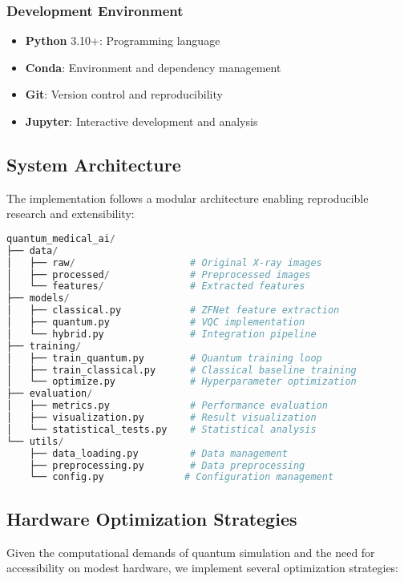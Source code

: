 \documentclass[conference]{IEEEtran}
\begin{document}
\subsubsection{Development Environment}
\begin{itemize}
    \item \textbf{Python} 3.10+: Programming language
    \item \textbf{Conda}: Environment and dependency management
    \item \textbf{Git}: Version control and reproducibility
    \item \textbf{Jupyter}: Interactive development and analysis
\end{itemize}

\subsection{System Architecture}

The implementation follows a modular architecture enabling reproducible research and extensibility:

\begin{lstlisting}[language=Python, caption=System Architecture Overview]
quantum_medical_ai/
├── data/
│   ├── raw/                    # Original X-ray images
│   ├── processed/              # Preprocessed images
│   └── features/               # Extracted features
├── models/
│   ├── classical.py            # ZFNet feature extraction
│   ├── quantum.py              # VQC implementation
│   └── hybrid.py               # Integration pipeline
├── training/
│   ├── train_quantum.py        # Quantum training loop
│   ├── train_classical.py      # Classical baseline training
│   └── optimize.py             # Hyperparameter optimization
├── evaluation/
│   ├── metrics.py              # Performance evaluation
│   ├── visualization.py        # Result visualization
│   └── statistical_tests.py    # Statistical analysis
└── utils/
    ├── data_loading.py         # Data management
    ├── preprocessing.py        # Data preprocessing
    └── config.py              # Configuration management
\end{lstlisting}

\subsection{Hardware Optimization Strategies}

Given the computational demands of quantum simulation and the need for accessibility on modest hardware, we implement several optimization strategies:
\end{document}

